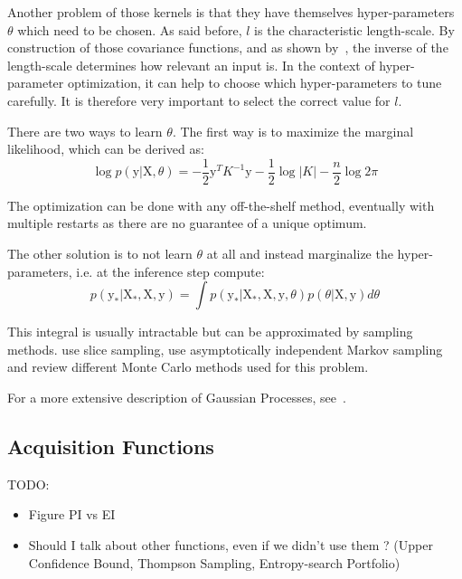 Another problem of those kernels is that they have themselves hyper-parameters $\theta$ which need to be chosen. As said before, $l$ is the characteristic length-scale. By construction of those covariance functions, and as shown by~\textcite{neal1996phd}, the inverse of the length-scale determines how relevant an input is. In the context of hyper-parameter optimization, it can help to choose which hyper-parameters to tune carefully. It is therefore very important to select the correct value for $l$. 

There are two ways to learn $\theta$. The first way is to maximize the marginal likelihood, which can be derived as:  
\begin{equation}
	\log p\left(\mathrm{y} | \mathrm{X}, \theta \right) = - \frac{1}{2} \mathrm{y}^T K^{-1} \mathrm{y} - \frac{1}{2} \log |K| - \frac{n}{2} \log 2 \pi
\end{equation}

The optimization can be done with any off-the-shelf method, eventually with multiple restarts as there are no guarantee of a unique optimum. 

The other solution is to not learn $\theta$ at all and instead marginalize the hyper-parameters, i.e. at the inference step compute:
\begin{equation}
    p\left( \mathrm{y_*} | \mathrm{X_*}, \mathrm{X}, \mathrm{y} \right)
    = \int p\left( \mathrm{y_*} | \mathrm{X_*}, \mathrm{X}, \mathrm{y}, \theta \right) p \left( \theta | \mathrm{X}, \mathrm{y} \right) d\theta
\end{equation}

This integral is usually intractable but can be approximated by sampling methods. \textcite{murray2010NIPS} use slice sampling, \textcite{garbuno2016CSDA} use asymptotically independent Markov sampling and \textcite{titsias2011} review different Monte Carlo methods used for this problem.

For a more extensive description of Gaussian Processes, see~\textcite{rasmussen2005}.

\subsection{Acquisition Functions}
\label{ssec:acqfunc}

TODO:
\begin{itemize}
    \item Figure PI vs EI
    \item Should I talk about other functions, even if we didn't use them ? (Upper Confidence Bound, Thompson Sampling, Entropy-search Portfolio)
\end{itemize}

